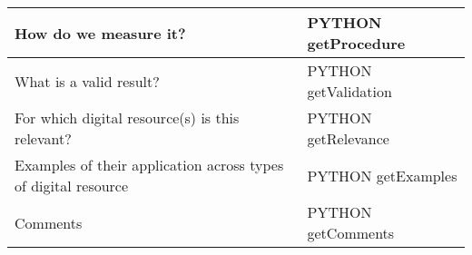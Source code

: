 \documentclass[english]{article}
\begin{document}
\begin{longtable}{|p{5cm}|p{9cm}|}
\\

\hline
How do we measure it? &

PYTHON getProcedure

\\

\hline
What is a valid result? &

PYTHON getValidation

\\

\hline
For which digital resource(s) is this relevant? &
PYTHON getRelevance

\\

\hline
Examples of their application across types of digital resource &
PYTHON getExamples

\\

\hline

Comments &
PYTHON getComments

\\
\hline

\end{longtable}
\end{document}
